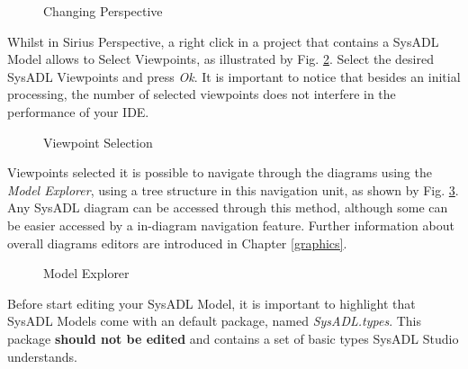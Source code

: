 \begin{figure}
	\caption{\label{quickstart:create:perspective}Changing Perspective}
\end{figure}

Whilst in Sirius Perspective, a right click in a project that contains a SysADL Model allows to Select Viewpoints, as illustrated by Fig. \ref{quickstart:create:viewpoints}. Select the desired SysADL Viewpoints and press \textit{Ok}. It is important to notice that besides an initial processing, the number of selected viewpoints does not interfere in the performance of your IDE.

\begin{figure}
	\caption{\label{quickstart:create:viewpoints}Viewpoint Selection}
\end{figure}

Viewpoints selected it is possible to navigate through the diagrams using the \textit{Model Explorer}, using a tree structure in this navigation unit, as shown by Fig. \ref{quickstart:create:explorer}. Any SysADL diagram can be accessed through this method, although some can be easier accessed by a in-diagram navigation feature. Further information about overall diagrams editors are introduced in Chapter \ref{graphics}.

\begin{figure}
	\caption{\label{quickstart:create:explorer}Model Explorer}
\end{figure}

Before start editing your SysADL Model, it is important to highlight that SysADL Models come with an default package, named \textit{SysADL.types}. This package \textbf{should not be edited} and contains a set of basic types SysADL Studio understands.